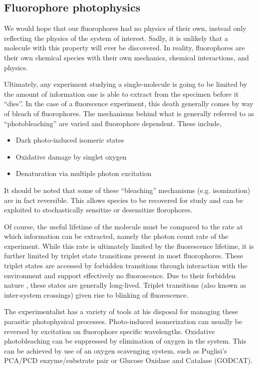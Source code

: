 \documentclass{article}
\newcommand{\refneeded}{\todo[color=green!20]{Referenced needed.}}
\begin{document}

\subsection{Fluorophore photophysics}
We would hope that our fluorophores had no physics of their own,
instead only reflecting the physics of the system of interest. Sadly,
it is unlikely that a molecule with this property will ever be
discovered. In reality, fluorophores are their own chemical species
with their own mechanics, chemical interactions, and physics. 

Ultimately, any experiment studying a single-molecule is going to be
limited by the amount of information one is able to extract from the
specimen before it ``dies''. In the case of a fluorscence experiment,
this death generally comes by way of bleach of fluorophores. The
mechanisms behind what is generally referred to as ``photobleaching''
are varied and fluorophore dependent. These include,
\begin{itemize}
\item Dark photo-induced isomeric states
\item Oxidative damage by singlet oxygen
\item Denaturation via multiple photon excitation\cite{Deschenes2002}
\end{itemize}
It should be noted that some of these ``bleaching'' mechanisms
(e.g. isomization) are in fact reversible. This allows species to be
recovered for study and can be exploited to stochastically sensitize
or desensitize florophores.

Of course, the useful lifetime of the molecule must be compared to the
rate at which information can be extracted, namely the photon count
rate of the experiment. While this rate is ultimately limited by the
fluorescence lifetime, it is further limited by triplet state transitions
present in most fluorophores. These triplet states are accessed by
forbidden transitions through
interaction with the environment and support effectively no
fluoroscence. Due to their forbidden nature , these states are
generally long-lived. Triplet transitions (also known as inter-system
crossings) given rise to blinking of fluorescence.

The experimentalist has a variety of tools at his disposal for managing
these parasitic photophysical processes. Photo-induced isomerization
can usually be reversed by excitation on fluorophore specific
wavelengths\cite{Fan2011}. Oxidative photobleaching can be suppressed
by elimination of oxygen in the system. This can be achieved by use of
an oxygen scavenging system, such as Puglisi's PCA/PCD
enzyme/substrate pair\cite{Aitkin2008} or Glucose Oxidase and Catalase
(GODCAT)\refneeded.
\end{document}
